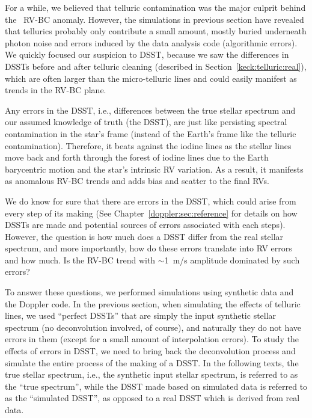 
For a while, we believed that telluric contamination was the major
culprit behind the \keck\ RV-BC anomaly. However, the simulations in
previous section have revealed that tellurics probably only contribute
a small amount, mostly buried underneath photon noise and errors
induced by the data analysis code (algorithmic errors). We quickly
focused our suspicion to DSST, because we saw the differences in DSSTs
before and after telluric cleaning (described in
Section~\ref{keck:telluric:real}), which are often larger than the
micro-telluric lines and could easily manifest as trends in the RV-BC
plane.

Any errors in the DSST, i.e., differences between the true stellar
spectrum and our assumed knowledge of truth (the DSST), are just like
persisting spectral contamination in the star's frame (instead of the
Earth's frame like the telluric contamination). Therefore, it beats
against the iodine lines as the stellar lines move back and forth
through the forest of iodine lines due to the Earth barycentric motion
and the star's intrinsic RV variation. As a result, it manifests as
anomalous RV-BC trends and adds bias and scatter to the final RVs.

We do know for sure that there are errors in the DSST, which could
arise from every step of its making (See
Chapter~\ref{doppler:sec:reference} for details on how DSSTs are made
and potential sources of errors associated with each steps). However,
the question is how much does a DSST differ from the real stellar
spectrum, and more importantly, how do these errors translate into RV
errors and how much. Is the RV-BC trend with $\sim$1~m/s amplitude
dominated by such errors?

To answer these questions, we performed simulations using synthetic
data and the Doppler code. In the previous section, when simulating
the effects of telluric lines, we used ``perfect DSSTs'' that are
simply the input synthetic stellar spectrum (no deconvolution
involved, of course), and naturally they do not have errors in them
(except for a small amount of interpolation errors). To study the
effects of errors in DSST, we need to bring back the deconvolution
process and simulate the entire process of the making of a DSST. In
the following texts, the true stellar spectrum, i.e., the synthetic
input stellar spectrum, is referred to as the ``true spectrum'', while
the DSST made based on simulated data is referred to as the
``simulated DSST'', as opposed to a real DSST which is derived from
real data.

